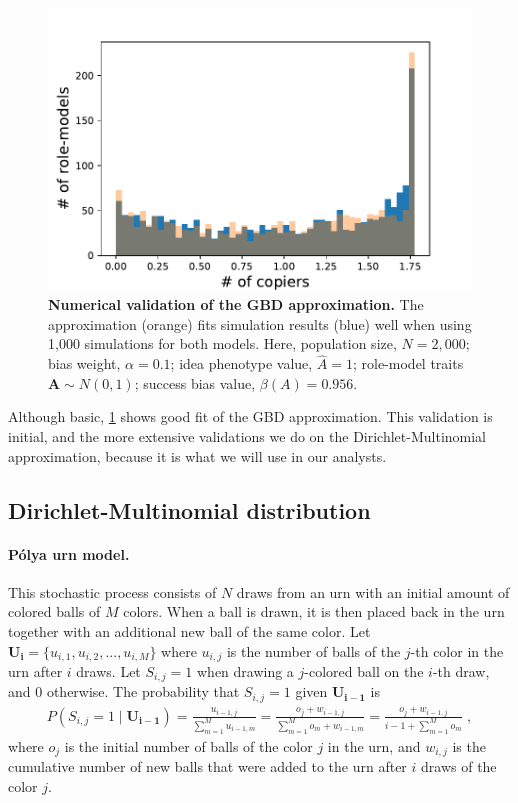 \documentclass[12pt]{extarticle}
\let\vec\mathbf
\begin{document}
\begin{figure}[h]
    \includegraphics[width=0.7\linewidth]{../figures/final/GBD_validation.pdf}
  \caption{
  \textbf{Numerical validation of the GBD approximation.}
  The approximation (orange) fits simulation results (blue) well when using 1,000 simulations for both models.
  Here, population size, $N=2,000$; bias weight, $\alpha=0.1$; idea phenotype value, $\hat{A}=1$; role-model traits $\vec{A} \sim N(0,1)$; success bias value, $\beta(A)=0.956$.}	
  \label{fig:GBD}
\end{figure}

Although basic, \cref{fig:GBD} shows good fit of the GBD approximation.
This validation is initial, and the more extensive validations we do on the Dirichlet-Multinomial approximation, because it is what we will use in our analysts.

\subsection{Dirichlet-Multinomial distribution}

\paragraph{P\'{o}lya urn model.}
This stochastic process consists of $N$ draws from an urn with an initial amount of colored balls of $M$ colors. When a ball is drawn, it is then placed back in the urn together with an additional new ball of the same color.
Let $\vec{U_i} = \{u_{i,1},u_{i,2},...,u_{i,M}\}$  where $u_{i,j}$ is the number of balls of the $j$-th color in the urn after $i$ draws.
Let $S_{i,j}=1$ when drawing a $j$-colored ball on the $i$-th draw, and $0$ otherwise. The probability that $S_{i,j}=1$ given $\vec{U_{i-1}}$ is
\begin{equation}\label{eq:polya}
\begin{split}
P(S_{i,j} = 1 \mid \vec{U_{i-1}}) = 
\frac{u_{i-1,j}}{\sum\limits_{m=1}^{M} u_{i-1,m}} = 
\frac{o_j + w_{i-1,j}}{\sum\limits_{m=1}^{M} o_m + w_{i-1,m}} = 
\frac{o_j + w_{i-1,j}}{i-1 + \sum\limits_{m=1}^{M} o_m} \;,
\end{split}
\end{equation}
where $o_j$ is the initial number of balls of the color $j$ in the urn, and $w_{i,j}$ is the cumulative number of new balls that were added to the urn after $i$ draws of the color $j$.
\\
\end{document}
